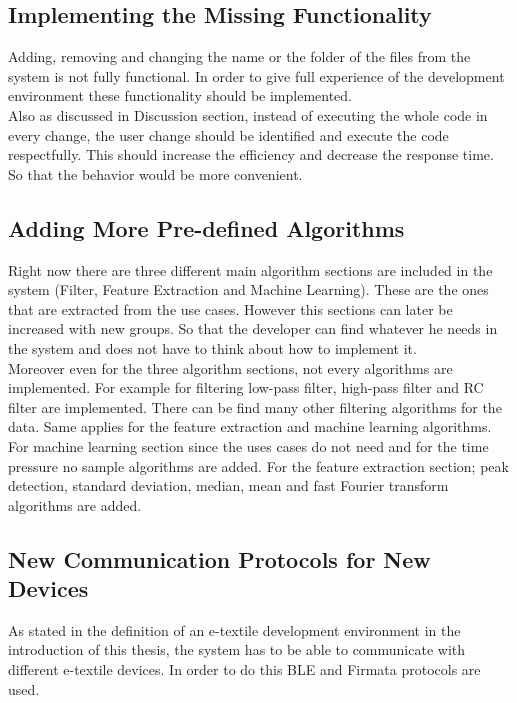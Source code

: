 \subsection{Implementing the Missing Functionality}

Adding, removing and changing the name or the folder of the files from the system is not fully functional. In order to give full experience of the development environment these functionality should be implemented. \\

Also as discussed in Discussion section, instead of executing the whole code in every change, the user change should be identified and execute the code respectfully. This should increase the efficiency and decrease the response time. So that the behavior would be more convenient.
	
\subsection{Adding More Pre-defined Algorithms}

Right now there are three different main algorithm sections are included in the system (Filter, Feature Extraction and Machine Learning). These are the ones that are extracted from the use cases. However this sections can later be increased with new groups. So that the developer can find whatever he needs in the system and does not have to think about how to implement it. \\

Moreover even for the three algorithm sections, not every algorithms are implemented. For example for filtering low-pass filter, high-pass filter and RC filter are implemented. There can be find many other filtering algorithms for the data. Same applies for the feature extraction and machine learning algorithms. For machine learning section since the uses cases do not need and for the time pressure no sample algorithms are added. For the feature extraction section; peak detection, standard deviation, median, mean and fast Fourier transform algorithms are added. 


\subsection{New Communication Protocols for New Devices}
As stated in the definition of an e-textile development environment in the introduction of this thesis, the system has to be able to communicate with different e-textile devices. In order to do this BLE and Firmata protocols are used.	\\ 

